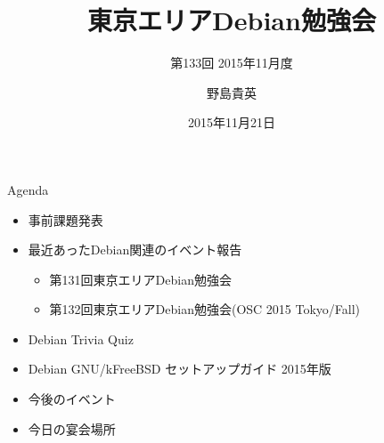 \title{東京エリアDebian勉強会}
\subtitle{第133回 2015年11月度}
\author{野島貴英}
\date{2015年11月21日}



\begin{frame}
\titlepage{}
\end{frame}

\begin{frame}{Agenda}
 \begin{minipage}[t]{0.45\hsize}
  \begin{itemize}
   \item 事前課題発表
   \item 最近あったDebian関連のイベント報告
	 \begin{itemize}
	 \item 第131回東京エリアDebian勉強会
         \item 第132回東京エリアDebian勉強会(OSC 2015 Tokyo/Fall)
	 \end{itemize}
  \end{itemize}
 \end{minipage} 
 \begin{minipage}[t]{0.45\hsize}
  \begin{itemize}
   \item Debian Trivia Quiz
   \item Debian GNU/kFreeBSD セットアップガイド 2015年版
   \item 今後のイベント
   \item 今日の宴会場所
  \end{itemize}
 \end{minipage}
\end{frame}

